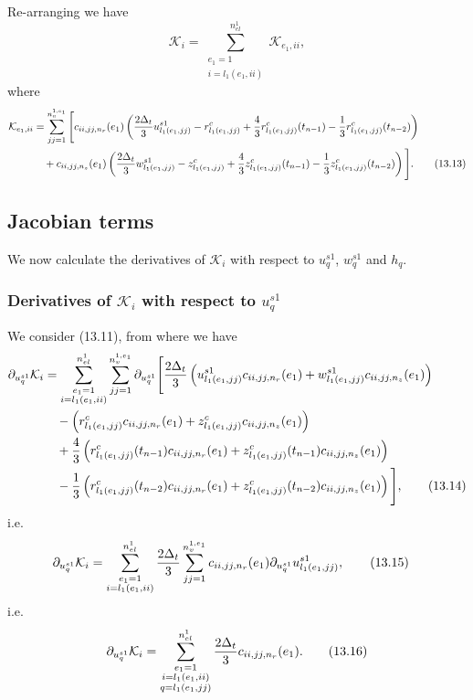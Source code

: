 \documentclass{article}
\begin{document}
Re-arranging we have
\begin{equation}
\mathcal{K}_i = \sum_{\substack{e_1=1\\ i=l_1(e_1,ii)}}^{n_{el}^1} \mathcal{K}_{e_1,ii}, \tag{13.12}
\end{equation}
where
\begin{align}
\mathcal{K}_{e_1,ii} &= \sum_{jj=1}^{n_v^{1,e_1}} \Bigg[ c_{ii,jj,n_r}(e_1) \left( \frac{2\Delta_t}{3} u_{l_1(e_1,jj)}^{s1} - r_{l_1(e_1,jj)}^c + \frac{4}{3} r_{l_1(e_1,jj)}^c(t_{n-1}) - \frac{1}{3} r_{l_1(e_1,jj)}^c(t_{n-2}) \right) \nonumber\\
&\quad + c_{ii,jj,n_z}(e_1) \left( \frac{2\Delta_t}{3} w_{l_1(e_1,jj)}^{s1} - z_{l_1(e_1,jj)}^c + \frac{4}{3} z_{l_1(e_1,jj)}^c(t_{n-1}) - \frac{1}{3} z_{l_1(e_1,jj)}^c(t_{n-2}) \right) \Bigg]. \tag{13.13}
\end{align}

\subsection{Jacobian terms} %
We now calculate the derivatives of $\mathcal{K}_i$ with respect to $u_q^{s1}$, $w_q^{s1}$ and $h_q$.

\subsubsection{Derivatives of $\mathcal{K}_i$ with respect to $u_q^{s1}$} %
We consider (13.11), from where we have
\begin{align}
\partial_{u_q^{s1}} \mathcal{K}_i &= \sum_{\substack{e_1=1\\ i=l_1(e_1,ii)}}^{n_{el}^1} \sum_{jj=1}^{n_v^{1,e_1}} \partial_{u_q^{s1}} \Bigg[ \frac{2\Delta_t}{3} \left( u_{l_1(e_1,jj)}^{s1} c_{ii,jj,n_r}(e_1) + w_{l_1(e_1,jj)}^{s1} c_{ii,jj,n_z}(e_1) \right) \nonumber\\
&\quad - \left( r_{l_1(e_1,jj)}^c c_{ii,jj,n_r}(e_1) + z_{l_1(e_1,jj)}^c c_{ii,jj,n_z}(e_1) \right) \nonumber\\
&\quad + \frac{4}{3} \left( r_{l_1(e_1,jj)}^c(t_{n-1}) c_{ii,jj,n_r}(e_1) + z_{l_1(e_1,jj)}^c(t_{n-1}) c_{ii,jj,n_z}(e_1) \right) \nonumber\\
&\quad - \frac{1}{3} \left( r_{l_1(e_1,jj)}^c(t_{n-2}) c_{ii,jj,n_r}(e_1) + z_{l_1(e_1,jj)}^c(t_{n-2}) c_{ii,jj,n_z}(e_1) \right) \Bigg], \tag{13.14}
\end{align}
i.e.
\begin{align}
\partial_{u_q^{s1}} \mathcal{K}_i &= \sum_{\substack{e_1=1\\ i=l_1(e_1,ii)}}^{n_{el}^1} \frac{2\Delta_t}{3} \sum_{jj=1}^{n_v^{1,e_1}} c_{ii,jj,n_r}(e_1) \partial_{u_q^{s1}} u_{l_1(e_1,jj)}^{s1}, \tag{13.15}
\end{align}
i.e.
\begin{equation}
\partial_{u_q^{s1}} \mathcal{K}_i = \sum_{\substack{e_1=1\\ i=l_1(e_1,ii)\\ q=l_1(e_1,jj)}}^{n_{el}^1} \frac{2\Delta_t}{3} c_{ii,jj,n_r}(e_1). \tag{13.16}
\end{equation}
\end{document}
